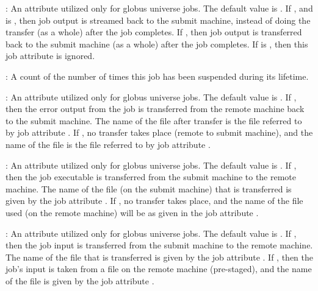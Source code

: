 \begin{description}
\item[\AdAttr{StreamOut}] :  
An attribute utilized only for globus universe jobs.
The default value is .
If , and  is , then 
job output is streamed back to the submit machine, instead
of doing the transfer (as a whole) after the job completes.
If , then
job output is transferred back to the submit machine
(as a whole) after the job completes.
If  is , then this job attribute is ignored.

\item[\AdAttr{TotalSuspensions}] : A count of the number of times this job
has been suspended during its lifetime.

\item[\AdAttr{TransferErr}] :  
An attribute utilized only for globus universe jobs.
The default value is .
If , then the error output from the job
is transferred from the remote machine back to the submit machine.
The name of the file after transfer is the file referred to
by job attribute .
If , no transfer takes place (remote to submit machine),
and the name of the file is the file referred to
by job attribute .

\item[\AdAttr{TransferExecutable}] :  
An attribute utilized only for globus universe jobs.
The default value is .
If , then the job executable is transferred from the submit
machine to the remote machine.
The name of the file (on the submit machine)
that is transferred is given by the
job attribute .
If , no transfer takes place, and
the name of the file used (on the remote machine) will be as
given in the job attribute .

\item[\AdAttr{TransferIn}] :  
An attribute utilized only for globus universe jobs.
The default value is .
If , then the job input is transferred from the submit
machine to the remote machine.
The name of the file that is transferred is given by the
job attribute .
If , then the job's input is taken from a file on the
remote machine (pre-staged), and 
the name of the file is given by the job attribute .


\end{description}
